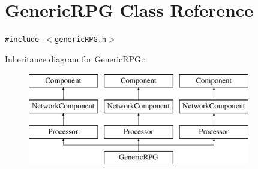 \hypertarget{classGenericRPG}{
\section{GenericRPG Class Reference}
\label{classGenericRPG}
}
{\tt \#include $<$genericRPG.h$>$}

Inheritance diagram for GenericRPG::\begin{figure}[H]
\begin{center}
\leavevmode
\includegraphics[height=4cm]{classGenericRPG}
\end{center}
\end{figure}
